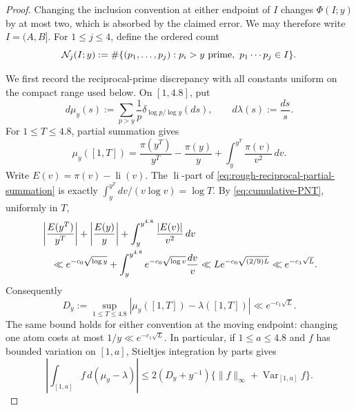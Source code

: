 \documentclass[11pt]{article}
\numberwithin{equation}{section}
\theoremstyle{definition}
\theoremstyle{remark}
\newcommand{\1}{\mathbf 1}
\begin{document}
\begin{proof}
Changing the inclusion convention at either endpoint of \(I\) changes
\(\Phi(I;y)\) by at most two, which is absorbed by the claimed error.
We may therefore write \(I=(A,B]\).  For \(1\le j\le4\), define the
ordered count
\begin{equation}
 \mathcal N_j(I;y):=
 \#\{(p_1,\ldots,p_j):p_i>y\ {\rm prime},\
                         p_1\cdots p_j\in I\}.
 \label{eq:rough-ordered-count}
\end{equation}

We first record the reciprocal-prime discrepancy with all constants
uniform on the compact range used below.  On \([1,4.8]\), put
\[
 d\mu_y(s):=\sum_{p>y}\frac1p
      \delta_{\log p/\log y}(ds),
 \qquad d\lambda(s):=\frac{ds}{s}.
\]
For \(1\le T\le4.8\), partial summation gives
\begin{equation}
 \mu_y([1,T])
 =\frac{\pi(y^T)}{y^T}-\frac{\pi(y)}y
    +\int_y^{y^T}\frac{\pi(v)}{v^2}\,dv.
 \label{eq:rough-reciprocal-partial-summation}
\end{equation}
Write \(E(v)=\pi(v)-\operatorname{li}(v)\).  The
\(\operatorname{li}\)-part of
\eqref{eq:rough-reciprocal-partial-summation} is exactly
\(\int_y^{y^T}dv/(v\log v)=\log T\).  By
\eqref{eq:cumulative-PNT}, uniformly in \(T\),
\begin{align}
 &\left|\frac{E(y^T)}{y^T}\right|
  +\left|\frac{E(y)}y\right|
  +\int_y^{y^{4.8}}\frac{|E(v)|}{v^2}\,dv\notag\\
 &\quad\ll e^{-c_0\sqrt{\log y}}
   +\int_y^{y^{4.8}}e^{-c_0\sqrt{\log v}}\frac{dv}{v}
 \ll L e^{-c_0\sqrt{(2/9)L}}
 \ll e^{-c_1\sqrt L}.
 \label{eq:rough-reciprocal-error-sum}
\end{align}
Consequently
\begin{equation}
 D_y:=\sup_{1\le T\le4.8}
 \left|\mu_y([1,T])-\lambda([1,T])\right|
 \ll e^{-c_1\sqrt L}.
 \label{eq:exceptional-Stieltjes-PNT}
\end{equation}
The same bound holds for either convention at the moving endpoint:
changing one atom costs at most \(1/y\ll e^{-c_1\sqrt L}\).
In particular, if \(1\le a\le4.8\) and \(f\) has bounded variation on
\([1,a]\), Stieltjes integration by parts gives
\begin{equation}
 \left|\int_{[1,a]}f\,d(\mu_y-\lambda)\right|
 \le2(D_y+y^{-1})
       \{\|f\|_\infty+\operatorname{Var}_{[1,a]}f\}.
 \label{eq:rough-one-dimensional-BV}
\end{equation}


\end{proof}
\end{document}
